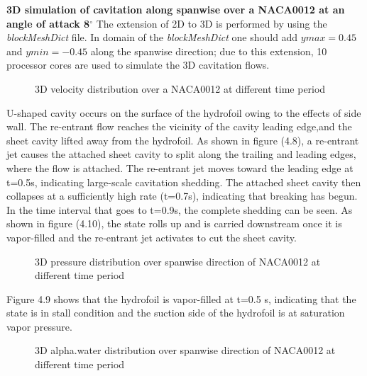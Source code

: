 \textbf{3D simulation of  cavitation along spanwise  over a  NACA0012 at an angle of attack 8$^{\circ}$}
The extension of 2D to 3D is performed by using the 
\textit{blockMeshDict} file. In domain of the \textit{blockMeshDict} one should add $ymax = 0.45$ and $ymin =-0.45$ along the spanwise direction; due to this extension, 10 processor cores are used to simulate the 3D cavitation flows.
\begin{figure}[H]
    \centering
    \qquad
   \qquad
      \caption{3D velocity distribution over a NACA0012 at different time period }
    \label{fig:fig16}
\end{figure}
U-shaped cavity occurs on the surface of the hydrofoil owing to the effects of side wall. The re-entrant flow reaches the vicinity of the cavity leading edge,and the sheet cavity lifted away from the 
hydrofoil.
As shown in figure (4.8), a re-entrant jet causes the attached sheet cavity to split along the trailing and leading edges, where the flow is attached. 
The re-entrant jet moves toward the leading edge at t=0.5s, indicating large-scale cavitation shedding.
The attached sheet cavity then collapses at a sufficiently high rate (t=0.7s), indicating that breaking has begun.
In the time interval that goes to t=0.9s, the complete shedding can be seen.
As shown in figure (4.10), the state rolls up and is carried downstream once it is vapor-filled and the re-entrant jet activates to cut the sheet cavity. 
 
\begin{figure}[H]
    \centering
    \qquad
   \qquad
      \caption{3D pressure distribution  over spanwise direction of NACA0012 at different time period }
    \label{fig:fig16}
\end{figure}
Figure 4.9 shows that the hydrofoil is vapor-filled at t=0.5 s, indicating that the state is in stall condition and the suction side of the hydrofoil is at saturation vapor pressure. 
\begin{figure}[H]
    \centering
    \qquad
   \qquad
      \caption{3D alpha.water distribution over spanwise direction  of NACA0012 at different time period }
    \label{fig:fig16}
\end{figure}

